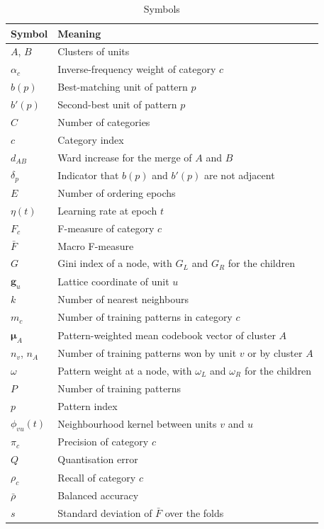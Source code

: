 \documentclass[conference,10pt]{IEEEtran}
\begin{document}
\begin{table}[H]
\caption{Symbols}
\label{tab:symbols}
\centering
\scriptsize
\begin{tabular}{lp{}}
\toprule
Symbol & Meaning \\
\midrule
$A$, $B$ & Clusters of units \\
$\alpha_c$ & Inverse-frequency weight of category $c$ \\
$b(p)$ & Best-matching unit of pattern $p$ \\
$b'(p)$ & Second-best unit of pattern $p$ \\
$C$ & Number of categories \\
$c$ & Category index \\
$d_{AB}$ & Ward increase for the merge of $A$ and $B$ \\
$\delta_p$ & Indicator that $b(p)$ and $b'(p)$ are not adjacent \\
$E$ & Number of ordering epochs \\
$\eta(t)$ & Learning rate at epoch $t$ \\
$F_c$ & F-measure of category $c$ \\
$\bar{F}$ & Macro F-measure \\
$G$ & Gini index of a node, with $G_L$ and $G_R$ for the children \\
$\mathbf{g}_u$ & Lattice coordinate of unit $u$ \\
$k$ & Number of nearest neighbours \\
$m_c$ & Number of training patterns in category $c$ \\
$\boldsymbol{\mu}_A$ & Pattern-weighted mean codebook vector of cluster $A$ \\
$n_v$, $n_A$ & Number of training patterns won by unit $v$ or by cluster $A$ \\
$\omega$ & Pattern weight at a node, with $\omega_L$ and $\omega_R$ for the children \\
$P$ & Number of training patterns \\
$p$ & Pattern index \\
$\phi_{vu}(t)$ & Neighbourhood kernel between units $v$ and $u$ \\
$\pi_c$ & Precision of category $c$ \\
$Q$ & Quantisation error \\
$\rho_c$ & Recall of category $c$ \\
$\bar{\rho}$ & Balanced accuracy \\
$s$ & Standard deviation of $\bar{F}$ over the folds \\

\end{tabular}
\end{table}
\end{document}
